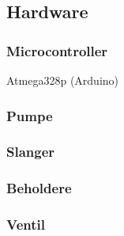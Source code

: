 \subsection{Hardware}

\subsubsection{Microcontroller}
Atmega328p (Arduino)
\subsubsection{Pumpe}

\subsubsection{Slanger}

\subsubsection{Beholdere}

\subsubsection{Ventil}
